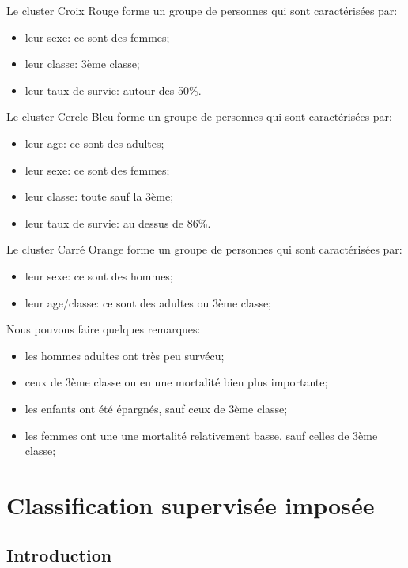 \documentclass[11pt, a4paper]{article}
\begin{document}
Le cluster Croix Rouge forme un groupe de personnes qui sont caractérisées par:
\begin{itemize}
    \item leur sexe: ce sont des femmes;
    \item leur classe: 3ème classe;
    \item leur taux de survie: autour des 50\%.\\
\end{itemize}

Le cluster Cercle Bleu forme un groupe de personnes qui sont caractérisées par:
\begin{itemize}
    \item leur age: ce sont des adultes;
    \item leur sexe: ce sont des femmes;
    \item leur classe: toute sauf la 3ème;
    \item leur taux de survie: au dessus de 86\%.\\
\end{itemize}

Le cluster Carré Orange forme un groupe de personnes qui sont caractérisées par:
\begin{itemize}
    \item leur sexe: ce sont des hommes;
    \item leur age/classe: ce sont des adultes ou 3ème classe;
\end{itemize}

Nous pouvons faire quelques remarques:
\begin{itemize}
    \item les hommes adultes ont très peu survécu;
    \item ceux de 3ème classe ou eu une mortalité bien plus importante;
    \item les enfants ont été épargnés, sauf ceux de 3ème classe;
    \item les femmes ont une une mortalité relativement basse, sauf celles de 3ème classe;
\end{itemize}


\newpage

\section{Classification supervisée imposée}
\subsection{Introduction}
\label{part2}
\end{document}
